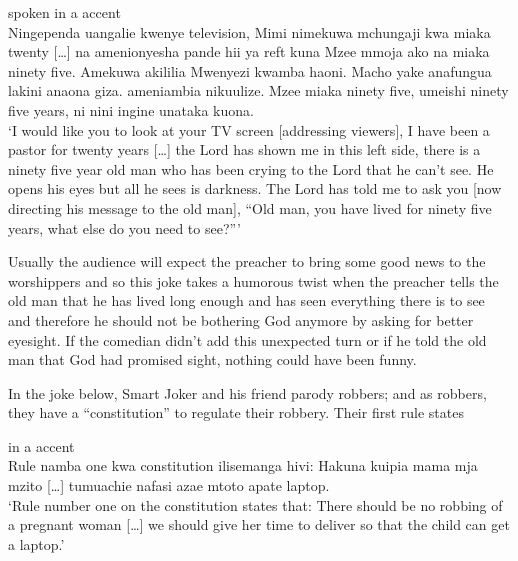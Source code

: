 \documentclass[output=paper]{langsci/langscibook}
\begin{document}
\ea\label{ex:muaka:8}
 spoken in a  accent\\ 
\smallskip
Ningependa uangalie kwenye television, Mimi nimekuwa mchungaji kwa miaka twenty […] na  amenionyesha pande hii ya reft kuna Mzee mmoja ako na miaka ninety five. Amekuwa akililia Mwenyezi  kwamba haoni. Macho yake anafungua lakini anaona giza.  ameniambia nikuulize. Mzee miaka ninety five, umeishi ninety five years, ni nini ingine unataka kuona.\\
\glt ‘I would like you to look at your TV screen [addressing viewers], I have been a pastor for twenty years […] the Lord has shown me in this left side, there is a ninety five year old man who has been crying to the Lord that he can’t see. He opens his eyes but all he sees is darkness. The Lord has told me to ask you [now directing his message to the old man], “Old man, you have lived for ninety five years, what else do you need to see?”’ \citep{ChurchillRaw2014}
\z

Usually the audience will expect the preacher to bring some good news to the worshippers and so this joke takes a humorous twist when the preacher tells the old man that he has lived long enough and has seen everything there is to see and therefore he should not be bothering God anymore by asking for better eyesight. If the comedian didn’t add this unexpected turn or if he told the old man that God had promised sight, nothing could have been funny. 

In the joke below, Smart Joker and his friend parody robbers; and as robbers, they have a “constitution” to regulate their robbery. Their first rule states

\ea\label{ex:muaka:9}
{ in a  accent}\\
\smallskip
 Rule namba one kwa constitution ilisemanga hivi: Hakuna kuipia mama mja mzito […] tumuachie nafasi azae mtoto apate laptop.\\
\glt ‘Rule number one on the constitution states that: There should be no robbing of a pregnant woman […] we should give her time to deliver so that the child can get a laptop.’ \citep{Churchill2013}
\z
\end{document}
